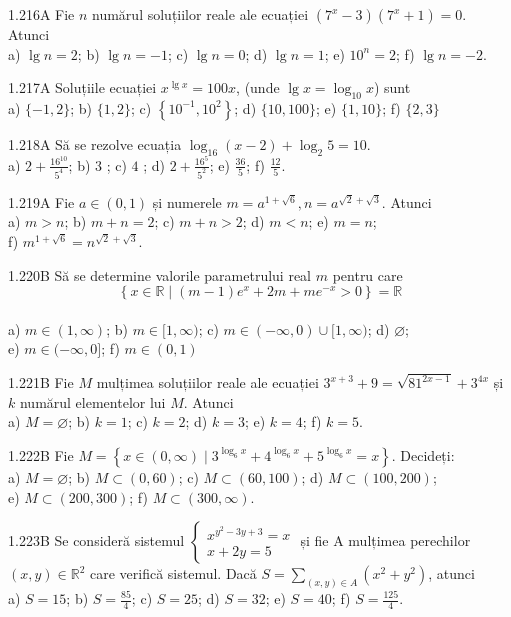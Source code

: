 \documentclass[11pt]{article}
\begin{document}
1.216A Fie $n$ numărul soluțiilor reale ale ecuației $\left(7^{x}-3\right)\left(7^{x}+1\right)=0$. Atunci\\ a) $\lg n=2$; b) $\lg n=-1$; c) $\lg n=0$; d) $\lg n=1$; e) $10^{n}=2$; f) $\lg n=-2$.

1.217A Soluțiile ecuației $x^{\lg x}=100 x$, (unde $\lg x=\log _{10} x$) sunt\\ a) $\{-1,2\}$; b) $\{1,2\}$; c) $\left\{10^{-1}, 10^{2}\right\}$; d) $\{10,100\}$; e) $\{1,10\}$; f) $\{2,3\}$

1.218A Să se rezolve ecuația $\log _{16}(x-2)+\log _{2} 5=10$.\\ a) $2+\frac{16^{10}}{5^{4}}$; b) $3$ ; c) $4$ ; d) $2+\frac{16^{5}}{5^{2}}$; e) $\frac{36}{5}$; f) $\frac{12}{5}$.

1.219A Fie $a \in(0,1)$ și numerele $m=a^{1+\sqrt{6}}, n=a^{\sqrt{2}+\sqrt{3}}$. Atunci\\ a) $m>n$; b) $m+n=2$; c) $m+n>2$; d) $m<n$; e) $m=n$;\\ f) $m^{1+\sqrt{6}}=n^{\sqrt{2}+\sqrt{3}}$.

1.220B Să se determine valorile parametrului real $m$ pentru care $$\left\{x \in \mathbb{R} \mid(m-1) e^{x}+2 m+m e^{-x}>0\right\}=\mathbb{R}$$\\ a) $m \in(1, \infty)$; b) $m \in[1, \infty)$; c) $m \in(-\infty, 0) \cup[1, \infty)$; d) $\varnothing$;\\ e) $m \in(-\infty, 0]$; f) $m \in(0,1)$

1.221B Fie $M$ mulțimea soluțiilor reale ale ecuației $3^{x+3}+9=\sqrt{81^{2 x-1}}+3^{4 x}$ și $k$ numărul elementelor lui $M$. Atunci\\ a) $M=\varnothing$; b) $k=1$; c) $k=2$; d) $k=3$; e) $k=4$; f) $k=5$.

1.222B Fie $M=\left\{x \in(0, \infty) \mid 3^{\log _{6} x}+4^{\log _{6} x}+5^{\log _{6} x}=x\right\}$. Decideți:\\ a) $M=\varnothing$; b) $M \subset(0,60)$; c) $M \subset(60,100)$; d) $M \subset(100,200)$; \\e) $M \subset(200,300)$; f) $M \subset(300, \infty)$.

1.223B Se consideră sistemul $\left\{\begin{array}{l}x^{y^{2}-3 y+3}=x \\ x+2 y=5\end{array}\right.$ și fie A mulțimea perechilor $(x, y) \in \mathbb{R}^{2}$ care verifică sistemul. Dacă $S=\sum_{(x, y) \in A}\left(x^{2}+y^{2}\right)$, atunci\\ a) $S=15$; b) $S=\frac{85}{4}$; c) $S=25$; d) $S=32$; e) $S=40$; f) $S=\frac{125}{4}$.
\end{document}
